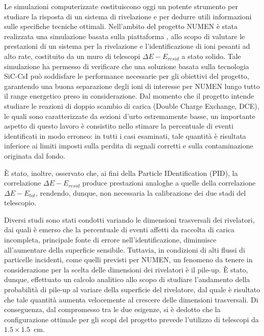 
Le simulazioni computerizzate costituiscono oggi un potente strumento per studiare la risposta di un sistema di rivelazione e per dedurre utili informazioni sulle specifiche tecniche ottimali.
Nell'ambito del progetto NUMEN è stata realizzata una simulazione basata sulla piattaforma \geant{}, allo scopo di valutare le prestazioni di un sistema per la rivelazione e l'identificazione di ioni pesanti ad alto rate, costituito da un muro di telescopi $\Delta E - E_{resid}$ a stato solido.
Tale simulazione ha permesso di verificare che una soluzione basata sulla tecnologia SiC-CsI può soddisfare le performance necessarie per gli obiettivi del progetto, garantendo una buona separazione degli ioni di interesse per NUMEN lungo tutto il range energetico preso in considerazione.
Dal momento che il progetto intende studiare le reazioni di doppio scambio di carica (Double Charge Exchange, DCE), le quali sono caratterizzate da sezioni d'urto estremamente basse, un importante aspetto di questo lavoro è consistito nello stimare la percentuale di eventi identificati in modo erroneo: in tutti i casi esaminati, tale quantità è risultata inferiore ai limiti imposti sulla perdita di segnali corretti e sulla contaminazione originata dal fondo.


È stato, inoltre, osservato che, ai fini della Particle IDentification (PID), la correlazione $\Delta E - E_{resid}$ produce prestazioni analoghe a quelle della correlazione $\Delta E - E_{tot}$, rendendo, dunque, non necessaria la calibrazione dei due stadi del telescopio.

Diversi studi sono stati condotti variando le dimensioni trasversali dei rivelatori, dai quali è emerso che la percentuale di eventi affetti da raccolta di carica incompleta, principale fonte di errore nell'identificazione, diminuisce all'aumentare della superficie sensibile. 
Tuttavia, in condizioni di alti flussi di particelle incidenti, come quelli previsti per NUMEN, un fenomeno da tenere in considerazione per la scelta delle dimensioni dei rivelatori è il pile-up.
È stato, dunque, effettuato un calcolo analitico allo scopo di studiare l'andamento della probabilità di pile-up al variare della superficie del rivelatore, dal quale è risultato che tale quantità aumenta velocemente al crescere delle dimensioni trasversali.
Di conseguenza, dal compromesso tra le due esigenze, si è dedotto che la configurazione ottimale per gli scopi del progetto prevede l'utilizzo di telescopi da $1.5 \times 1.5$~cm.


